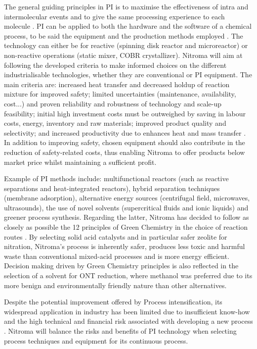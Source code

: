 The general guiding principles in PI is to maximise the effectiveness of intra and intermolecular events and to give the same processing experience to each molecule \cite{randall_process_2020}. PI can be applied to both the hardware and the software of a chemical process, to be said the equipment and the production methods employed \cite{stankiewicz_re-engineering_2003}. The technology can either be for reactive (spinning disk reactor and microreactor) or non-reactive operations (static mixer, COBR crystallizer). Nitroma will aim at following the developed criteria to make informed choices on the different industrialisable technologies, whether they are conventional or PI equipment. The main criteria are: increased heat transfer and decreased holdup of reaction mixture for improved safety; limited uncertainties (maintenance, availability, cost...) and proven reliability and robustness of technology and scale-up feasibility; initial high investment costs must be outweighed by saving in labour costs, energy, inventory and raw materials; improved product quality and selectivity; and increased productivity due to enhances heat and mass transfer \cite{randall_process_2020}. In addition to improving safety, chosen equipment should also contribute in the reduction of safety-related costs, thus enabling Nitroma to offer products below market price whilst maintaining a sufficient profit.

Example of PI methods include: multifunctional reactors (such as reactive separations and heat-integrated reactors), hybrid separation techniques (membrane adsorption), alternative energy sources (centrifugal field, microwaves, ultrasounds), the use of novel solvents (supercritical fluids and ionic liquids) and greener process synthesis. Regarding the latter, Nitroma has decided to follow as closely as possible the 12 principles of Green Chemistry in the choice of reaction routes \cite{anastas_green_2010}. By selecting solid acid catalysts and in particular safer zeolite for nitration, Nitroma's process is inherently safer, produces less toxic and harmful waste than conventional mixed-acid processes and is more energy efficient. Decision making driven by Green Chemistry principles is also reflected in the selection of a solvent for ONT reduction, where methanol was preferred due to its more benign and environmentally friendly nature than other alternatives.

Despite the potential improvement offered by Process intensification, its widespread application in industry has been limited due to insufficient know-how and the high technical and financial risk associated with developing a new process \cite{randall_process_2020}. Nitroma will balance the risks and benefits of PI technology when selecting process techniques and equipment for its continuous process.


